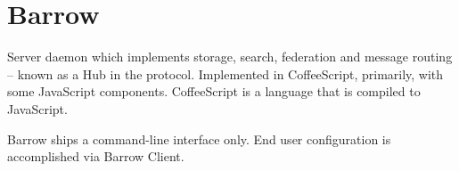 \chapter{Barrow}

Server daemon which implements storage, search, federation and message routing -- known
as a Hub in the protocol. Implemented in CoffeeScript, primarily, with some
JavaScript components. CoffeeScript is a language that is compiled to JavaScript.

Barrow ships a command-line interface only. End user configuration is accomplished
via Barrow Client.
